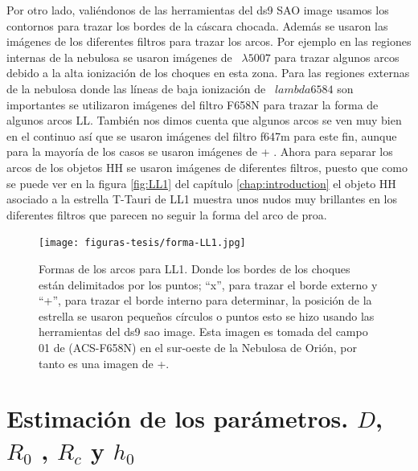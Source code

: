 Por otro lado, valiéndonos de las herramientas del ds9 SAO image usamos los contornos para trazar los bordes de la cáscara chocada. Además se usaron las imágenes de los diferentes filtros para trazar los arcos. Por ejemplo en las regiones internas de la nebulosa se usaron imágenes de \oiii{}~\(\lambda5007\) para trazar algunos arcos debido a la alta ionización de los choques en esta zona. Para las regiones externas de la nebulosa donde las líneas de baja ionización de \nii{}~\(lambda6584\) son importantes se utilizaron imágenes del filtro F658N para trazar la forma de algunos arcos LL. También nos dimos cuenta que algunos arcos se ven muy bien en el continuo así que se usaron imágenes del filtro f647m para este fin, aunque para la mayoría de los casos se usaron imágenes de \ha{} + \nii{}. Ahora para separar los arcos de los objetos HH se usaron imágenes de diferentes filtros, puesto que como se puede ver en la figura \ref{fig:LL1} del capítulo \ref{chap:introduction} el objeto HH asociado a la estrella T-Tauri de LL1 muestra unos nudos muy brillantes en los diferentes filtros que parecen no seguir la forma del arco de proa. 


\begin{figure}
  \centering
   \texttt{[image: figuras-tesis/forma-LL1.jpg]}
  \caption{Formas de los arcos para LL1. Donde los bordes de los choques están delimitados por los puntos; ``x'', para trazar el borde externo y ``+'', para trazar el borde interno para determinar, la posición de la estrella se usaron pequeños círculos o puntos esto se hizo usando las herramientas del ds9 sao image. Esta imagen es tomada del campo 01 de \citet{Bally:2006a} (ACS-F658N) en el sur-oeste de la Nebulosa de Orión, por tanto es una imagen de \ha{}+\nii{}. }
  \label{fig:arco-LL1}
\end{figure}

\section{Estimación de los parámetros. \(D\), \(R_{0}\) , \(R_{c}\) y \(h_{0}\) }
\label{sec:parametros}

